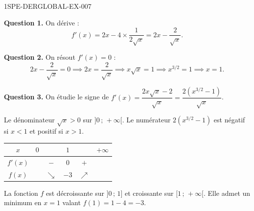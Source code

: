 \begin{corrige}{1SPE-DERGLOBAL-EX-007}

\textbf{Question 1.} On dérive :
\[
f'(x) = 2x - 4 \times \frac{1}{2\sqrt{x}} = \boxed{2x - \frac{2}{\sqrt{x}}}.
\]

\textbf{Question 2.} On résout $f'(x) = 0$ :
\[
2x - \frac{2}{\sqrt{x}} = 0 \implies 2x = \frac{2}{\sqrt{x}} \implies x\sqrt{x} = 1 \implies x^{3/2} = 1 \implies x = 1.
\]

\textbf{Question 3.} On étudie le signe de $f'(x) = \dfrac{2x\sqrt{x} - 2}{\sqrt{x}} = \dfrac{2(x^{3/2}-1)}{\sqrt{x}}$.

Le dénominateur $\sqrt{x} > 0$ sur $]0\,;\,+\infty[$. Le numérateur $2(x^{3/2}-1)$ est négatif si $x < 1$ et positif si $x > 1$.

\medskip
\begin{center}
\begin{tabular}{|c|ccccc|}
\hline
$x$ & $0$ & & $1$ & & $+\infty$ \\
\hline
$f'(x)$ & & $-$ & $0$ & $+$ & \\
\hline
$f(x)$ & & $\searrow$ & $-3$ & $\nearrow$ & \\
\hline
\end{tabular}
\end{center}

La fonction $f$ est décroissante sur $]0\,;\,1]$ et croissante sur $[1\,;\,+\infty[$. Elle admet un minimum en $x = 1$ valant $f(1) = 1 - 4 = -3$.
\end{corrige}
